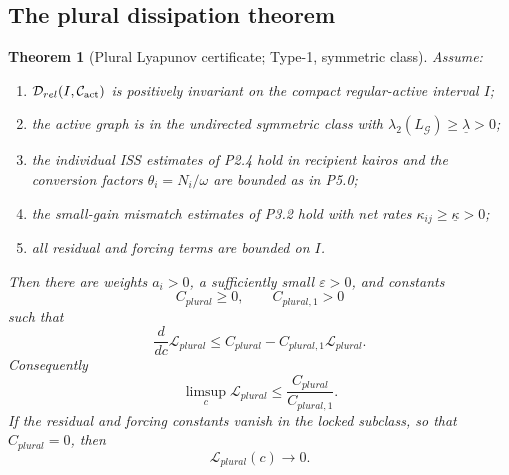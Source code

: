 \documentclass[11pt,a4paper]{article}
\def\mathfrak#1{#1}%
\def\mathrm#1{#1}%
\theoremstyle{definition}
\theoremstyle{plain}
\newtheorem{theorem}[definition]{Theorem}
\theoremstyle{remark}
\begin{document}
\subsection{The plural dissipation theorem}

\begin{theorem}[Plural Lyapunov certificate; Type-1, symmetric class]\label{thm:plural-lyap}
Assume:
\begin{enumerate}[label=\textup{(\roman*)},leftmargin=1.2cm]
\item \(\mathcal D_{\mathrm{rel}}(I,\mathcal C_{\rm act})\) is positively invariant
on the compact regular-active interval \(I\);
\item the active graph is in the undirected symmetric class with
\(\lambda_2(L_{\mathcal G})\ge\underline\lambda>0\);
\item the individual ISS estimates of P2.4 hold in recipient kairos and the
conversion factors \(\theta_i=N_i/\omega\) are bounded as in P5.0;
\item the small-gain mismatch estimates of P3.2 hold with net rates
\(\kappa_{ij}\ge\underline\kappa>0\);
\item all residual and forcing terms are bounded on \(I\).
\end{enumerate}
Then there are weights \(a_i>0\), a sufficiently small \(\varepsilon>0\), and
constants
\[
C_{\mathrm{plural}}\ge0,
\qquad
C_{\mathrm{plural},1}>0
\]
such that
\[
\boxed{\;
\frac{d}{d\mathfrak c}\mathcal L_{\mathrm{plural}}
\le
C_{\mathrm{plural}}
-
C_{\mathrm{plural},1}\mathcal L_{\mathrm{plural}}.
\;}
\]
Consequently
\[
\limsup_{\mathfrak c}
\mathcal L_{\mathrm{plural}}
\le
\frac{C_{\mathrm{plural}}}{C_{\mathrm{plural},1}}.
\]
If the residual and forcing constants vanish in the locked subclass, so that
\(C_{\mathrm{plural}}=0\), then
\[
\mathcal L_{\mathrm{plural}}(\mathfrak c)\to0.
\]
\end{theorem}
\end{document}
